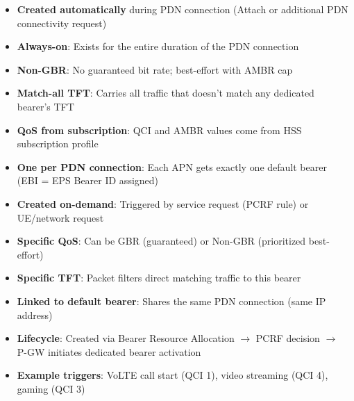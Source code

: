



\begin{itemize}
\tightlist
\item
  \textbf{Created automatically} during PDN connection (Attach or additional PDN connectivity request)
\item
  \textbf{Always-on}: Exists for the entire duration of the PDN connection
\item
  \textbf{Non-GBR}: No guaranteed bit rate; best-effort with AMBR cap
\item
  \textbf{Match-all TFT}: Carries all traffic that doesn’t match any dedicated bearer’s TFT
\item
  \textbf{QoS from subscription}: QCI and AMBR values come from HSS subscription profile
\item
  \textbf{One per PDN connection}: Each APN gets exactly one default bearer (EBI = EPS Bearer ID assigned)
\end{itemize}


\begin{itemize}
\tightlist
\item
  \textbf{Created on-demand}: Triggered by service request (PCRF rule) or UE/\allowbreak{}network request
\item
  \textbf{Specific QoS}: Can be GBR (guaranteed) or Non-GBR (prioritized best-effort)
\item
  \textbf{Specific TFT}: Packet filters direct matching traffic to this bearer
\item
  \textbf{Linked to default bearer}: Shares the same PDN connection (same IP address)
\item
  \textbf{Lifecycle}: Created via Bearer Resource Allocation \ensuremath{\to} PCRF decision \ensuremath{\to} P-GW initiates dedicated bearer activation
\item
  \textbf{Example triggers}: VoLTE call start (QCI 1), video streaming (QCI 4), gaming (QCI 3)
\end{itemize}



